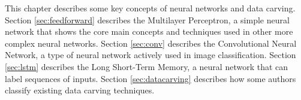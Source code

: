 This chapter describes some key concepts of neural networks and data carving. Section \ref{sec:feedforward} describes the Multilayer Perceptron, a simple neural network that shows the core main concepts and techniques used in other more complex neural networks. Section \ref{sec:conv} describes the Convolutional Neural Network, a type of neural network actively used in image classification. Section \ref{sec:lstm} describes the Long Short-Term Memory, a neural network that can label sequences of inputs. Section \ref{sec:datacarving} describes how some authors classify existing data carving techniques.
